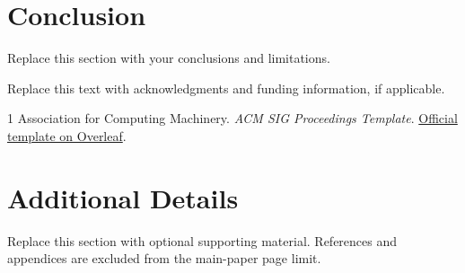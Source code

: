 \documentclass[sigconf,nonacm]{acmart}
\begin{document}
\section{Conclusion}
Replace this section with your conclusions and limitations.

\begin{acks}
Replace this text with acknowledgments and funding information, if applicable.
\end{acks}

% 
% 
\begin{thebibliography}{1}
Association for Computing Machinery.
\newblock \emph{ACM SIG Proceedings Template}.
\newblock \href{https://www.overleaf.com/latex/templates/association-for-computing-machinery-acm-sig-proceedings-template/bmvfhcdnxfty}{Official template on Overleaf}.
\end{thebibliography}

\clearpage
\appendix
\section{Additional Details}
Replace this section with optional supporting material. References and
appendices are excluded from the main-paper page limit.
\end{document}
